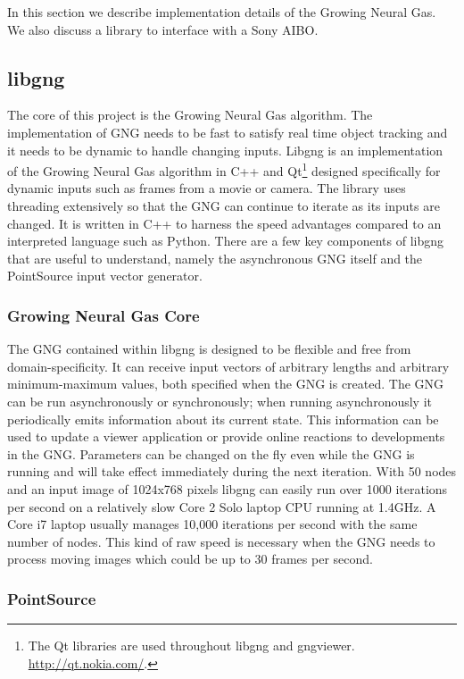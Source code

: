\documentclass{article}
\renewcommand{\|}{\origbar} %
\begin{document}
In this section we describe implementation details of the Growing Neural Gas. We also discuss a library to interface with a Sony AIBO.

\subsection{libgng}

The core of this project is the Growing Neural Gas algorithm. The implementation of GNG needs to be fast to satisfy real time object tracking and it needs to be dynamic to handle changing inputs. Libgng is an implementation of the Growing Neural Gas algorithm in C++ and Qt\footnote{The Qt libraries are used throughout libgng and gngviewer. \url{http://qt.nokia.com/}.} designed specifically for dynamic inputs such as frames from a movie or camera. The library uses threading extensively so that the GNG can continue to iterate as its inputs are changed. It is written in C++ to harness the speed advantages compared to an interpreted language such as Python. There are a few key components of libgng that are useful to understand, namely the asynchronous GNG itself and the PointSource input vector generator.

\subsubsection{Growing Neural Gas Core}

The GNG contained within libgng is designed to be flexible and free from domain-specificity. It can receive input vectors of arbitrary lengths and arbitrary minimum-maximum values, both specified when the GNG is created. The GNG can be run asynchronously or synchronously; when running asynchronously it periodically emits information about its current state. This information can be used to update a viewer application or provide online reactions to developments in the GNG. Parameters can be changed on the fly even while the GNG is running and will take effect immediately during the next iteration. With 50 nodes and an input image of 1024x768 pixels libgng can easily run over 1000 iterations per second on a relatively slow Core 2 Solo laptop CPU running at 1.4GHz. A Core i7 laptop usually manages 10,000 iterations per second with the same number of nodes. This kind of raw speed is necessary when the GNG needs to process moving images which could be up to 30 frames per second.

\subsubsection{PointSource}
\end{document}
